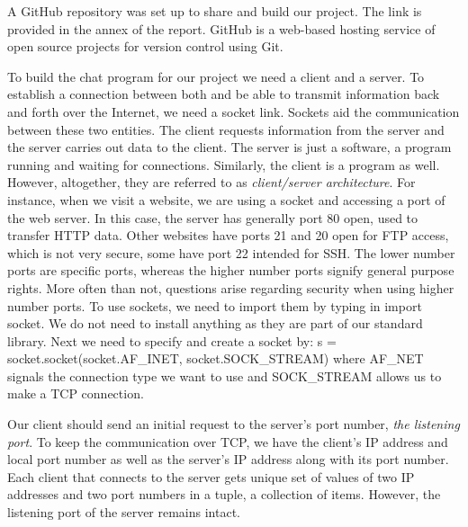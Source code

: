 A GitHub repository was set up to share and build our project. The link is provided in the annex of the report. GitHub is a web-based hosting service of open source projects for version control using Git. 

To build the chat program for our project we need a client and a server. To establish a connection between both and be able to transmit information back and forth over the Internet, we need a socket link. Sockets aid the communication between these two entities. The client requests information from the server and the server carries out data to the client. The server is just a software, a program running and waiting for connections. Similarly, the client is a program as well. However, altogether, they are referred to as \emph{client/server architecture}. For instance, when we visit a website, we are using a socket and accessing a port of the web server. In this case, the server has generally port 80 open, used to transfer HTTP data. Other websites have ports 21 and 20 open for FTP access, which is not very secure, some have port 22 intended for SSH. The lower number ports are specific ports, whereas the higher number ports signify general purpose rights. More often than not, questions arise regarding security when using higher number ports. To use sockets, we need to import them by typing in import socket. We do not need to install anything as they are part of our standard library. Next we need to specify and create a socket by: s = socket.socket(socket.AF\_INET, socket.SOCK\_STREAM) where AF\_NET signals the connection type we want to use and SOCK\_STREAM allows us to make a TCP connection. 

Our client should send an initial request to the server's port number, \emph{the listening port}. To keep the communication over TCP, we have the client's IP address and local port number as well as the server's IP address along with its port number. Each client that connects to the server gets unique set of values of two IP addresses and two port numbers in a tuple, a collection of items. However, the listening port of the server remains intact. 